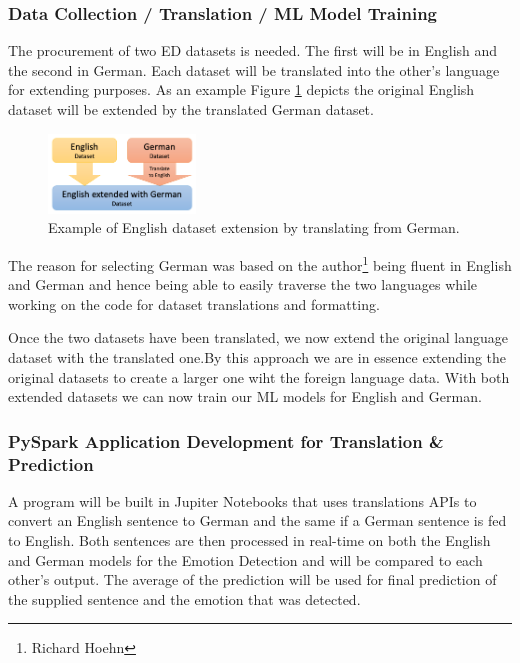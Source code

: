 \documentclass[11pt]{article}
\begin{document}
\subsubsection{Data Collection / Translation / ML Model Training}

The procurement of two ED datasets is needed. The first will be in English and the second in German. Each dataset will be translated into the other’s language for extending purposes. As an example Figure \ref{fig:dataset-extension} depicts the original English dataset will be extended by the translated German dataset.

\begin{figure}[h]
    \centering
    \includegraphics[width=0.35\textwidth]{Dataset-Extension}
    \caption{Example of English dataset extension by translating from German.}
    \label{fig:dataset-extension}
\end{figure}

The reason for selecting German was based on the author\footnote{Richard Hoehn} being fluent in English and German and hence being able to easily traverse the two languages while working on the code for dataset translations and formatting.

Once the two datasets have been translated, we now extend the original language dataset with the translated one.By this approach we are in essence extending the original datasets to create a larger one wiht the foreign language data. With both extended datasets we can now train our ML models for English and German.

\subsubsection{PySpark Application Development for Translation \& Prediction}
A program will be built in Jupiter Notebooks that uses translations APIs to convert an English sentence to German and the same if a German sentence is fed to English. Both sentences are then processed in real-time on both the English and German models for the Emotion Detection and will be compared to each other's output. The average of the prediction will be used for final prediction of the supplied sentence and the emotion that was detected.
\end{document}
